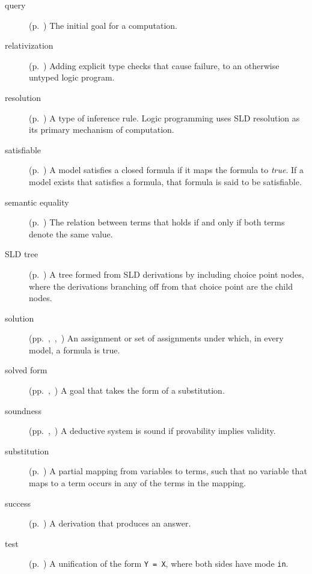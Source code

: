 \begin{description}
\item[query]
(p.~\pageref{sec:queries})
The initial goal for a computation.

\item[relativization]
(p.~\pageref{gi:relativization})
Adding explicit type checks that cause failure,
to an otherwise untyped logic program.

\item[resolution]
(p.~\pageref{gi:resolution})
A type of inference rule.
Logic programming uses SLD resolution
as its primary mechanism of computation.

\item[satisfiable]
(p.~\pageref{gi:satisfiable})
A model satisfies a closed formula if it maps the formula to \textit{true}.
If a model exists that satisfies a formula,
that formula is said to be satisfiable.

\item[semantic equality]
(p.~\pageref{gi:semantic-equality})
The relation between terms that holds
if and only if both terms denote the same value.

\item[SLD tree]
(p.~\pageref{gi:sld-tree})
A tree formed from SLD derivations by including choice point nodes,
where the derivations branching off from that choice point
are the child nodes.

\item[solution]
(pp.~\pageref{gi:solution},~\pageref{gi:solution2},~\pageref{gi:solution3})
An assignment or set of assignments under which, in every model,
a formula is true.

\item[solved form]
(pp.~\pageref{gi:solved-form},~\pageref{gi:solved-form2})
A goal that takes the form of a substitution.

\item[soundness]
(pp.~\pageref{thm:soundness},~\pageref{gi:soundness2})
A deductive system is sound if provability implies validity.

\item[substitution]
(p.~\pageref{gi:substitution})
A partial mapping from variables to terms,
such that no variable that maps to a term
occurs in any of the terms in the mapping.

\item[success]
(p.~\pageref{gi:success})
A derivation that produces an answer.

\item[test]
(p.~\pageref{gi:test})
A unification of the form \texttt{Y = X},
where both sides have mode \texttt{in}.


\end{description}

